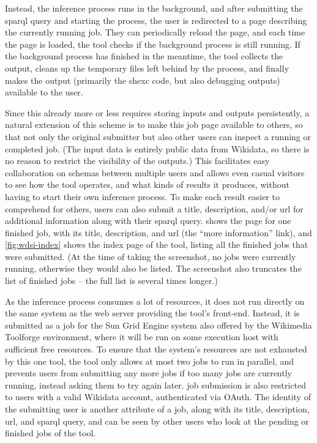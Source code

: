Instead, the inference process runs in the background,
and after submitting the \gls{sparql} query and starting the process,
the user is redirected to a page describing the currently running \gls{job}.
They can periodically reload the page,
and each time the page is loaded,
the tool checks if the background process is still running.
If the background process has finished in the meantime,
the tool collects the output,
cleans up the temporary files left behind by the process,
and finally makes the output
(primarily the \gls{shexc} code, but also debugging outputs)
available to the user.

Since this already more or less requires storing inputs and outputs persistently,
a natural extension of this scheme is to make this \gls{job} page available to others,
so that not only the original submitter but also other users can inspect a running or completed \gls{job}.
(The input data is entirely public data from \gls{Wikidata},
so there is no reason to restrict the visibility of the outputs.)
This facilitates easy collaboration on \glspl{schema} between multiple users
and allows even casual visitors to see how the tool operates,
and what kinds of results it produces,
without having to start their own inference process.
To make each result easier to comprehend for others,
users can also submit a title, description, and/or \gls{url} for additional information
along with their \gls{sparql} query.
 shows the page for one finished \gls{job},
with its title, description, and \gls{url} (the “more information” link),
and \cref{fig:wdsi-index} shows the index page of the tool,
listing all the finished jobs that were submitted.
(At the time of taking the screenshot,
no jobs were currently running,
otherwise they would also be listed.
The screenshot also truncates the list of finished jobs –
the full list is several times longer.)

As the inference process consumes a lot of resources,
it does not run directly on the same system as the web server providing the tool’s front-end.
Instead, it is submitted as a job for the Sun Grid Engine system also offered by the \gls{Wikimedia Toolforge} environment,
where it will be run on some execution host with sufficient free resources.
To ensure that the system’s resources are not exhausted by this one tool,
the tool only allows at most two \glspl{job} to run in parallel,
and prevents users from submitting any more \glspl{job} if too many \glspl{job} are currently running,
instead asking them to try again later.
\Gls{job} submission is also restricted to users with a valid \gls{Wikidata} account,
authenticated via OAuth.
The identity of the submitting user is another attribute of a \gls{job},
along with its title, description, \gls{url}, and \gls{sparql} query,
and can be seen by other users who look at the pending or finished \glspl{job} of the tool.

